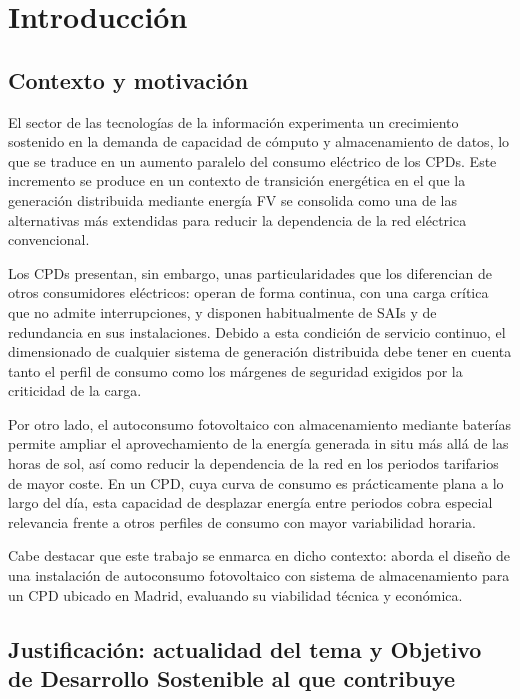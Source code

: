 \chapter{Introducción}
\label{ch:introduccion}

\section{Contexto y motivación}
\label{sec:intro-contexto}

El sector de las tecnologías de la información experimenta un crecimiento sostenido en la demanda de capacidad de cómputo y almacenamiento de datos, lo que se traduce en un aumento paralelo del consumo eléctrico de los \acp{CPD}.
Este incremento se produce en un contexto de transición energética en el que la generación distribuida mediante energía \ac{FV} se consolida como una de las alternativas más extendidas para reducir la dependencia de la red eléctrica convencional.

Los \acp{CPD} presentan, sin embargo, unas particularidades que los diferencian de otros consumidores eléctricos: operan de forma continua, con una carga crítica que no admite interrupciones, y disponen habitualmente de \acp{SAI} y de redundancia en sus instalaciones. Debido a esta condición de servicio continuo, el dimensionado de cualquier sistema de generación distribuida debe tener en cuenta tanto el perfil de consumo como los márgenes de seguridad exigidos por la criticidad de la carga.

Por otro lado, el autoconsumo fotovoltaico con almacenamiento mediante baterías permite ampliar el aprovechamiento de la energía generada in situ más allá de las horas de sol, así como reducir la dependencia de la red en los periodos tarifarios de mayor coste. En un \ac{CPD}, cuya curva de consumo es prácticamente plana a lo largo del día, esta capacidad de desplazar energía entre periodos cobra especial relevancia frente a otros perfiles de consumo con mayor variabilidad horaria.

Cabe destacar que este trabajo se enmarca en dicho contexto: aborda el diseño de una instalación de autoconsumo fotovoltaico con sistema de almacenamiento para un \ac{CPD} ubicado en Madrid, evaluando su viabilidad técnica y económica.

\section{Justificación: actualidad del tema y Objetivo de Desarrollo Sostenible al que contribuye}
\label{sec:intro-justificacion}

